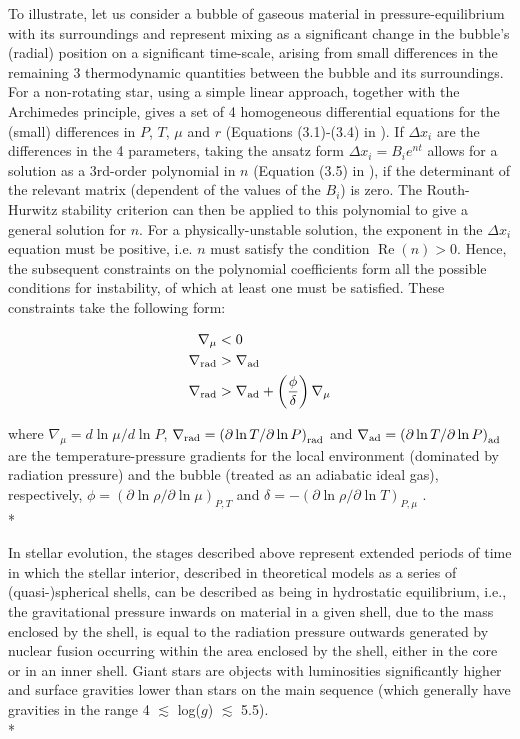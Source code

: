 \documentclass[12pt, a4paper]{report}
\begin{document}
To illustrate, let us consider a bubble of gaseous material in pressure-equilibrium with its surroundings and represent mixing as a significant change in the bubble's (radial) position on a significant time-scale, arising from small differences in the remaining 3 thermodynamic quantities between the bubble and its surroundings. For a non-rotating star, using a simple linear approach, together with the Archimedes principle, gives a set of 4 homogeneous differential equations for the (small) differences in $P$, $T$, $\mu$ and $r$ (Equations (3.1)-(3.4) in \cite{2017RSOS....470192S}). If $\Delta x_{i}$ are the differences in the 4 parameters, taking the ansatz form $\Delta x_{i} = B_{i} e^{nt}$ allows for a solution as a 3rd-order polynomial in $n$ (Equation (3.5) in \cite{2017RSOS....470192S}), if the determinant of the relevant matrix (dependent of the values of the $B_{i}$) is zero. The Routh-Hurwitz stability criterion can then be applied to this polynomial to give a general solution for $n$. For a physically-unstable solution, the exponent in the $\Delta x_{i}$ equation must be positive, i.e. $n$ must satisfy the condition $\operatorname{Re}(n) > 0$. Hence, the subsequent constraints on the polynomial coefficients form all the possible conditions for instability,  of which at least one must be satisfied. These constraints take the following form:

\begin{align}
\nabla _{\mu} &< 0 \label{mu_inv_ineq} \\
\nabla _{\textnormal{rad}} &> \nabla _{\textnormal{ad}} \label{schwarz_ineq} \\
\nabla _{\textnormal{rad}} &> \nabla _{\textnormal{ad}} + \left( \frac{\phi}{\delta} \right) \nabla _{\mu} \label{ledoux_ineq}
\end{align}

where $\nabla _{\mu} = d\ln\mu / d\ln P$, $\nabla _{\textnormal{rad}} = \left(\partial\ln T / \partial\ln P \right)_{\textnormal{rad}}$ and $\nabla _{\textnormal{ad}} = \left(\partial\ln T / \partial\ln P \right)_{\textnormal{ad}}$ are the temperature-pressure gradients for the local environment (dominated by radiation pressure) and the bubble (treated as an adiabatic ideal gas), respectively, $\phi = \left( \partial \ln\rho / \partial \ln\mu \right)_{P,T}$ and $\delta = -\left( \partial \ln\rho / \partial \ln T \right)_{P,\mu}$  \citep{1980A&A....91..175K}. \\*

In stellar evolution, the stages described above represent extended periods of time in which the stellar interior, described in theoretical models as a series of (quasi-)spherical shells, can be described as being in hydrostatic equilibrium, i.e., the gravitational pressure inwards on material in a given shell, due to the mass enclosed by the shell, is equal to the radiation pressure outwards generated by nuclear fusion occurring within the area enclosed by the shell, either in the core or in an inner shell. Giant stars are objects with luminosities significantly higher and surface gravities lower than stars on the main sequence (which generally have gravities in the range 4 $\lesssim$ log($g$) $\lesssim$ 5.5). \\*
\end{document}
